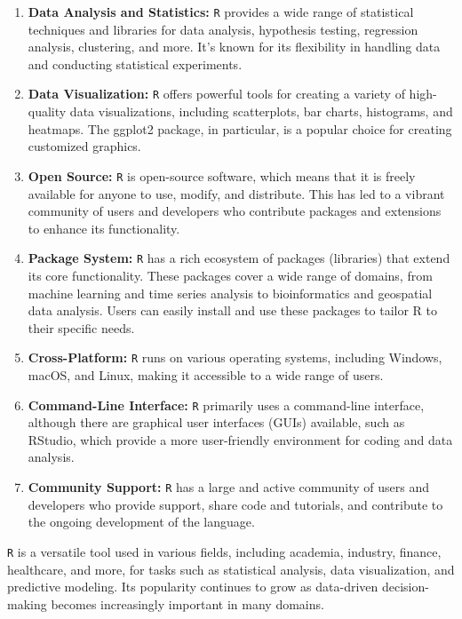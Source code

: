 \documentclass[
]{book}
\begin{document}
\begin{enumerate}
\def\labelenumi{\arabic{enumi}.}
\item
  \textbf{Data Analysis and Statistics:} \texttt{R} provides a wide range of statistical techniques and libraries for data analysis, hypothesis testing, regression analysis, clustering, and more. It's known for its flexibility in handling data and conducting statistical experiments.
\item
  \textbf{Data Visualization:} \texttt{R} offers powerful tools for creating a variety of high-quality data visualizations, including scatterplots, bar charts, histograms, and heatmaps. The ggplot2 package, in particular, is a popular choice for creating customized graphics.
\item
  \textbf{Open Source:} \texttt{R} is open-source software, which means that it is freely available for anyone to use, modify, and distribute. This has led to a vibrant community of users and developers who contribute packages and extensions to enhance its functionality.
\item
  \textbf{Package System:} \texttt{R} has a rich ecosystem of packages (libraries) that extend its core functionality. These packages cover a wide range of domains, from machine learning and time series analysis to bioinformatics and geospatial data analysis. Users can easily install and use these packages to tailor R to their specific needs.
\item
  \textbf{Cross-Platform:} \texttt{R} runs on various operating systems, including Windows, macOS, and Linux, making it accessible to a wide range of users.
\item
  \textbf{Command-Line Interface:} \texttt{R} primarily uses a command-line interface, although there are graphical user interfaces (GUIs) available, such as RStudio, which provide a more user-friendly environment for coding and data analysis.
\item
  \textbf{Community Support:} \texttt{R} has a large and active community of users and developers who provide support, share code and tutorials, and contribute to the ongoing development of the language.
\end{enumerate}

\texttt{R} is a versatile tool used in various fields, including academia, industry, finance, healthcare, and more, for tasks such as statistical analysis, data visualization, and predictive modeling. Its popularity continues to grow as data-driven decision-making becomes increasingly important in many domains.
\end{document}

